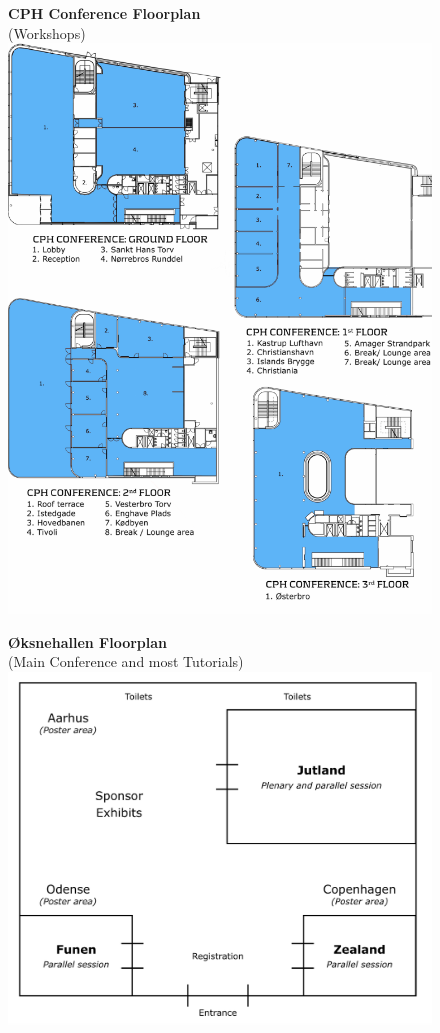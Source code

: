 \begin{figure}[p]
\centering
\textbf{CPH Conference Floorplan}\\
(Workshops)
\vspace{3em}
\includegraphics[width=\textwidth]{content/fmatter/floorplan_DGI_w_grid.pdf}
\end{figure}

\begin{figure}[p]
\centering
\textbf{Øksnehallen Floorplan}\\
(Main Conference and most Tutorials)
\vspace{10em}
\includegraphics[width=\textwidth]{content/fmatter/floorplan_oeksnehallen.png}
\end{figure}
